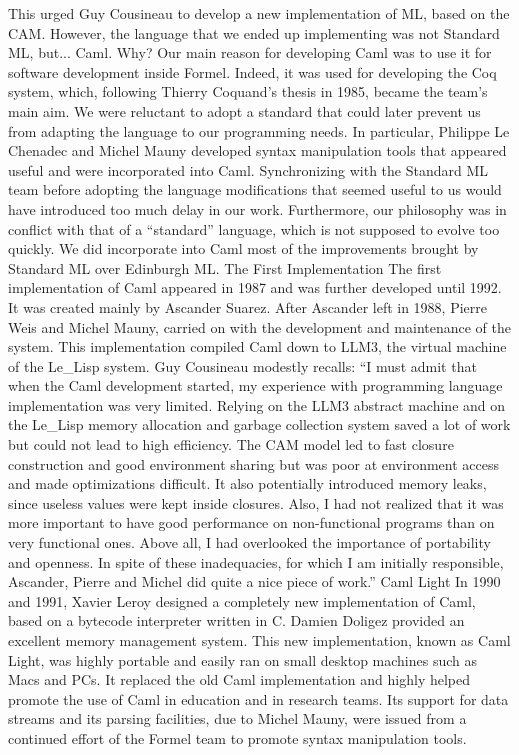 \documentclass[14pt]{matmex-diploma-custom}
\begin{document}
This urged Guy Cousineau to develop a new implementation of ML, based on the CAM. However, the language that we ended up implementing was not Standard ML, but... Caml. Why? Our main reason for developing Caml was to use it for software development inside Formel. Indeed, it was used for developing the Coq system, which, following Thierry Coquand's thesis in 1985, became the team's main aim. We were reluctant to adopt a standard that could later prevent us from adapting the language to our programming needs. In particular, Philippe Le Chenadec and Michel Mauny developed syntax manipulation tools that appeared useful and were incorporated into Caml. Synchronizing with the Standard ML team before adopting the language modifications that seemed useful to us would have introduced too much delay in our work. Furthermore, our philosophy was in conflict with that of a “standard” language, which is not supposed to evolve too quickly. We did incorporate into Caml most of the improvements brought by Standard ML over Edinburgh ML.
The First Implementation
The first implementation of Caml appeared in 1987 and was further developed until 1992. It was created mainly by Ascander Suarez. After Ascander left in 1988, Pierre Weis and Michel Mauny, carried on with the development and maintenance of the system. This implementation compiled Caml down to LLM3,
the virtual machine of the Le\_Lisp system. Guy Cousineau modestly recalls: “I must admit that when the Caml development started, my experience with programming language implementation was very limited. Relying on the LLM3 abstract machine and on the Le\_Lisp memory allocation and garbage collection system saved a lot of work but could not lead to high efficiency. The CAM model led to fast closure construction and good environment sharing but was poor at environment access and made optimizations difficult. It also potentially introduced memory leaks, since useless values were kept inside closures. Also, I had not realized that it was more important to have good performance on non-functional programs than on very functional ones. Above all, I had overlooked the importance of portability and openness. In spite of these inadequacies, for which I am initially responsible, Ascander, Pierre and Michel did quite a nice piece of work.”
Caml Light
In 1990 and 1991, Xavier Leroy designed a completely new implementation of Caml, based on a bytecode interpreter written in C. Damien Doligez provided an excellent memory management system. This new implementation, known as Caml Light, was highly portable and easily ran on small desktop machines such as Macs and PCs. It replaced the old Caml implementation and highly helped promote the use of Caml in education and in research teams. Its support for data streams and its parsing facilities, due to Michel Mauny, were issued from a continued effort of the Formel team to promote syntax manipulation tools.
\end{document}
